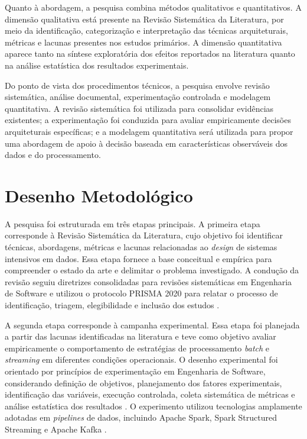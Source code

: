 Quanto à abordagem, a pesquisa combina métodos qualitativos e quantitativos. A dimensão qualitativa está presente na Revisão Sistemática da Literatura, por meio da identificação, categorização e interpretação das técnicas arquiteturais, métricas e lacunas presentes nos estudos primários. A dimensão quantitativa aparece tanto na síntese exploratória dos efeitos reportados na literatura quanto na análise estatística dos resultados experimentais.

Do ponto de vista dos procedimentos técnicos, a pesquisa envolve revisão sistemática, análise documental, experimentação controlada e modelagem quantitativa. A revisão sistemática foi utilizada para consolidar evidências existentes; a experimentação foi conduzida para avaliar empiricamente decisões arquiteturais específicas; e a modelagem quantitativa será utilizada para propor uma abordagem de apoio à decisão baseada em características observáveis dos dados e do processamento.

\section{Desenho Metodológico}
\label{sec:desenho-metodologico}

A pesquisa foi estruturada em três etapas principais. A primeira etapa corresponde à Revisão Sistemática da Literatura, cujo objetivo foi identificar técnicas, abordagens, métricas e lacunas relacionadas ao \textit{design} de sistemas intensivos em dados. Essa etapa fornece a base conceitual e empírica para compreender o estado da arte e delimitar o problema investigado. A condução da revisão seguiu diretrizes consolidadas para revisões sistemáticas em Engenharia de Software \cite{kitchenham2007guidelines,kitchtchenham2009,kitchenham2015evidence} e utilizou o protocolo PRISMA 2020 para relatar o processo de identificação, triagem, elegibilidade e inclusão dos estudos \cite{page2021prisma}.

A segunda etapa corresponde à campanha experimental. Essa etapa foi planejada a partir das lacunas identificadas na literatura e teve como objetivo avaliar empiricamente o comportamento de estratégias de processamento \textit{batch} e \textit{streaming} em diferentes condições operacionais. O desenho experimental foi orientado por princípios de experimentação em Engenharia de Software, considerando definição de objetivos, planejamento dos fatores experimentais, identificação das variáveis, execução controlada, coleta sistemática de métricas e análise estatística dos resultados \cite{wohlin2012experimentation}. O experimento utilizou tecnologias amplamente adotadas em \textit{pipelines} de dados, incluindo Apache Spark, Spark Structured Streaming e Apache Kafka \cite{zaharia2016apache,armbrust2018structured,kreps2011kafka}.

